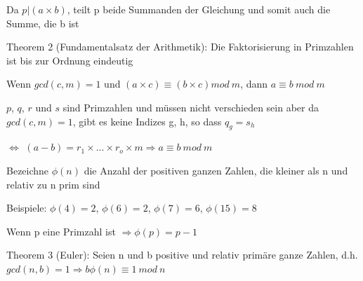 \documentclass[a4paper]{article}
\begin{document}
\begin{multicols}{3}
\begin{itemize*}
\begin{itemize*}
                  \item Da $p|(a\times b)$, teilt p beide Summanden der Gleichung und somit auch die Summe, die b ist
            \end{itemize*}
            \item Theorem 2 (Fundamentalsatz der Arithmetik): Die Faktorisierung in Primzahlen ist bis zur Ordnung eindeutig
            \begin{itemize*}
                  \item Wenn $gcd(c,m)=1$ und $(a\times c)\equiv(b\times c)mod\ m$, dann $a\equiv b\ mod\ m$
                  \item $p$, $q$, $r$ und $s$ sind Primzahlen und müssen nicht verschieden sein aber da $gcd(c,m)=1$, gibt es keine Indizes g, h, so dass $q_g = s_h$
                  \item[$\Leftrightarrow$] $(a-b)=r_1\times ...\times r_o\times m\Rightarrow a \equiv b\ mod\ m$
            \end{itemize*}
            \item Bezeichne $\phi(n)$ die Anzahl der positiven ganzen Zahlen, die kleiner als n und relativ zu n prim sind
            \begin{itemize*}
                  \item Beispiele: $\phi(4) = 2$, $\phi(6)=2$, $\phi(7)=6$, $\phi(15)=8$
                  \item Wenn p eine Primzahl ist $\Rightarrow\phi(p)=p-1$
            \end{itemize*}
            \item Theorem 3 (Euler): Seien n und b positive und relativ primäre ganze Zahlen, d.h. $gcd(n, b) = 1 \Rightarrow b \phi(n) \equiv 1\ mod\ n$

\end{itemize*}
\end{multicols}
\end{document}
